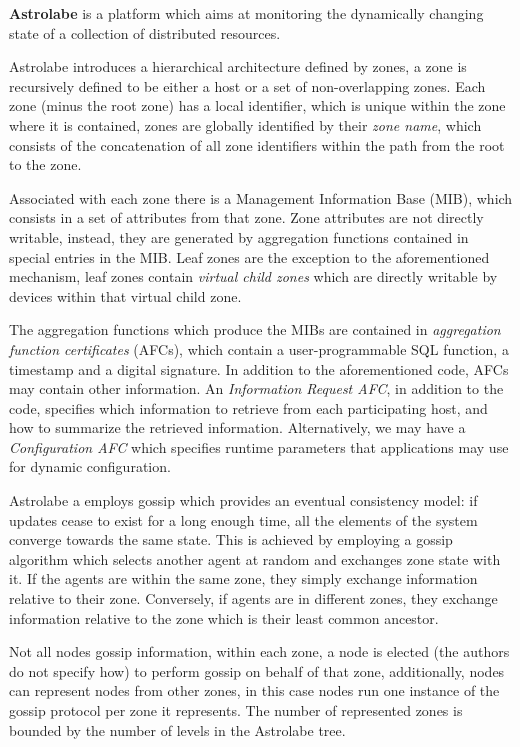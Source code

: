 \textbf{Astrolabe} \cite{Renesse2003} is a platform which aims at monitoring the dynamically changing state of a collection of distributed resources. 

Astrolabe introduces a hierarchical architecture defined by zones, a zone is recursively defined to be either a host or a set of non-overlapping zones. Each zone (minus the root zone) has a local identifier, which is unique within the zone where it is contained, zones are globally identified by their \textit{zone name}, which consists of the concatenation of all zone identifiers within the path from the root to the zone.

Associated with each zone there is a Management Information Base (MIB), which consists in a set of attributes from that zone. Zone attributes are not directly writable, instead, they are generated by aggregation functions contained in special entries in the MIB. Leaf zones are the exception to the aforementioned mechanism, leaf zones contain \textit{virtual child zones} which are directly writable by devices within that virtual child zone.

The aggregation functions which produce the MIBs are contained in \textit{aggregation function certificates} (AFCs), which contain a user-programmable SQL function, a timestamp and a digital signature. In addition to the aforementioned code, AFCs may contain other information. An \textit{Information Request AFC}, in addition to the code, specifies which information to retrieve from each participating host, and how to summarize the retrieved information. Alternatively, we may have a \textit{Configuration AFC} which specifies runtime parameters that applications may use for dynamic configuration.

Astrolabe a employs gossip which provides an eventual consistency model: if updates cease to exist for a long enough time, all the elements of the system  converge towards the same state. This is achieved by employing a gossip algorithm which selects another agent at random and exchanges zone state with it. If the agents are within the same zone, they simply exchange information relative to their zone. Conversely, if agents are in different zones, they exchange information relative to the zone which is their least common ancestor.

Not all nodes gossip information, within each zone, a node is elected (the authors do not specify how) to perform gossip on behalf of that zone, additionally, nodes can represent nodes from other zones, in this case nodes run one instance of the gossip protocol per zone it represents. The number of represented zones is bounded by the number of levels in the Astrolabe tree.

